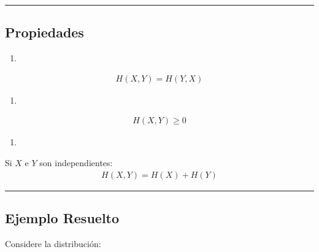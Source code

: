 \documentclass[letterpaper,10pt,english]{jupyterBook}
\begin{document}
\bigskip\hrule\bigskip



\subsection{Propiedades}
\label{\detokenize{01_theory/conditional_entropy:propiedades}}\begin{enumerate}
%
\item {} 
\sphinxAtStartPar
{}

\end{enumerate}
\begin{equation*}
\begin{split}
H(X,Y)=H(Y,X)
\end{split}
\end{equation*}\begin{enumerate}
%
\setcounter{enumi}{1}
\item {} 
\sphinxAtStartPar
{}

\end{enumerate}
\begin{equation*}
\begin{split}
H(X,Y)\ge 0
\end{split}
\end{equation*}\begin{enumerate}
%
\setcounter{enumi}{2}
\item {} 
\sphinxAtStartPar
{}

\end{enumerate}

\sphinxAtStartPar
Si \(X\) e \(Y\) son independientes:
\begin{equation*}
\begin{split}
H(X,Y)=H(X)+H(Y)
\end{split}
\end{equation*}

\bigskip\hrule\bigskip



\subsection{Ejemplo Resuelto}
\label{\detokenize{01_theory/conditional_entropy:ejemplo-resuelto}}
\sphinxAtStartPar
Considere la distribución:
\end{document}
